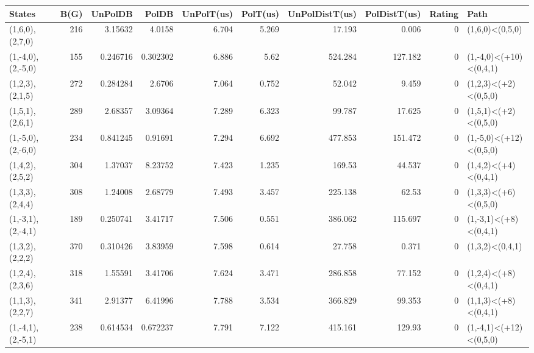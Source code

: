 \begin{tabular}{lrrrrrrrrl}
\hline
 States             &   B(G) &   UnPolDB &        PolDB &   UnPolT(us) &   PolT(us) &   UnPolDistT(us) &   PolDistT(us) &   Rating & Path                   \\
\hline
 (1,6,0),(2,7,0)    &    216 &  3.15632  &     4.0158   &        6.704 &      5.269 &           17.193 &          0.006 &        0 & (1,6,0)<(0,5,0)        \\
 (1,-4,0),(2,-5,0)  &    155 &  0.246716 &     0.302302 &        6.886 &      5.62  &          524.284 &        127.182 &        0 & (1,-4,0)<(+10)<(0,4,1) \\
 (1,2,3),(2,1,5)    &    272 &  0.284284 &     2.6706   &        7.064 &      0.752 &           52.042 &          9.459 &        0 & (1,2,3)<(+2)<(0,5,0)   \\
 (1,5,1),(2,6,1)    &    289 &  2.68357  &     3.09364  &        7.289 &      6.323 &           99.787 &         17.625 &        0 & (1,5,1)<(+2)<(0,5,0)   \\
 (1,-5,0),(2,-6,0)  &    234 &  0.841245 &     0.91691  &        7.294 &      6.692 &          477.853 &        151.472 &        0 & (1,-5,0)<(+12)<(0,5,0) \\
 (1,4,2),(2,5,2)    &    304 &  1.37037  &     8.23752  &        7.423 &      1.235 &          169.53  &         44.537 &        0 & (1,4,2)<(+4)<(0,4,1)   \\
 (1,3,3),(2,4,4)    &    308 &  1.24008  &     2.68779  &        7.493 &      3.457 &          225.138 &         62.53  &        0 & (1,3,3)<(+6)<(0,5,0)   \\
 (1,-3,1),(2,-4,1)  &    189 &  0.250741 &     3.41717  &        7.506 &      0.551 &          386.062 &        115.697 &        0 & (1,-3,1)<(+8)<(0,4,1)  \\
 (1,3,2),(2,2,2)    &    370 &  0.310426 &     3.83959  &        7.598 &      0.614 &           27.758 &          0.371 &        0 & (1,3,2)<(0,4,1)        \\
 (1,2,4),(2,3,6)    &    318 &  1.55591  &     3.41706  &        7.624 &      3.471 &          286.858 &         77.152 &        0 & (1,2,4)<(+8)<(0,4,1)   \\
 (1,1,3),(2,2,7)    &    341 &  2.91377  &     6.41996  &        7.788 &      3.534 &          366.829 &         99.353 &        0 & (1,1,3)<(+8)<(0,4,1)   \\
 (1,-4,1),(2,-5,1)  &    238 &  0.614534 &     0.672237 &        7.791 &      7.122 &          415.161 &        129.93  &        0 & (1,-4,1)<(+12)<(0,5,0) \\

\end{tabular}
